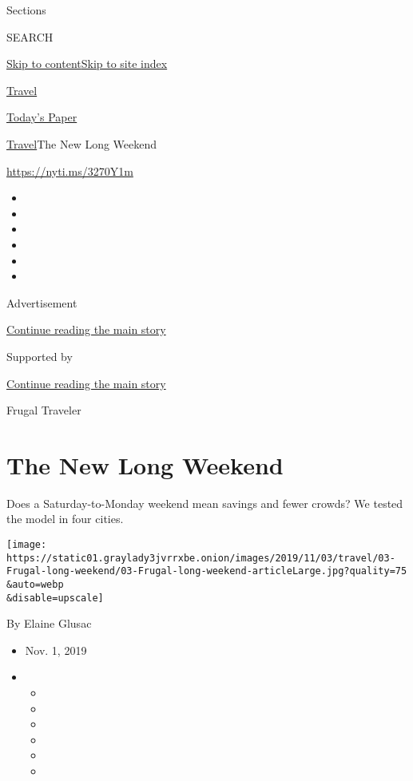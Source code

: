 Sections

SEARCH

\protect\hyperlink{site-content}{Skip to
content}\protect\hyperlink{site-index}{Skip to site index}

\href{https://www.nytimes3xbfgragh.onion/section/travel}{Travel}

\href{https://myaccount.nytimes3xbfgragh.onion/auth/login?response_type=cookie\&client_id=vi}{}

\href{https://www.nytimes3xbfgragh.onion/section/todayspaper}{Today's
Paper}

\href{/section/travel}{Travel}\textbar{}The New Long Weekend

\url{https://nyti.ms/3270Y1m}

\begin{itemize}
\item
\item
\item
\item
\item
\item
\end{itemize}

Advertisement

\protect\hyperlink{after-top}{Continue reading the main story}

Supported by

\protect\hyperlink{after-sponsor}{Continue reading the main story}

Frugal Traveler

\hypertarget{the-new-long-weekend}{%
\section{The New Long Weekend}\label{the-new-long-weekend}}

Does a Saturday-to-Monday weekend mean savings and fewer crowds? We
tested the model in four cities.

\texttt{[image: https://static01.graylady3jvrrxbe.onion/images/2019/11/03/travel/03-Frugal-long-weekend/03-Frugal-long-weekend-articleLarge.jpg?quality=75\\\&auto=webp\\\&disable=upscale]}

By Elaine Glusac

\begin{itemize}
\item
  Nov. 1, 2019
\item
  \begin{itemize}
  \item
  \item
  \item
  \item
  \item
  \item
  \end{itemize}
\end{itemize}

